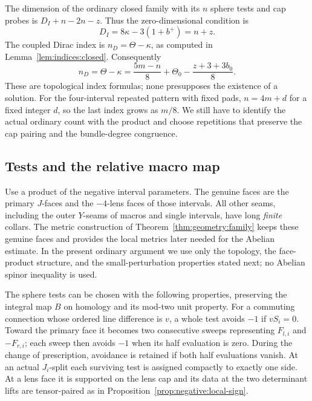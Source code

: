The dimension of the ordinary closed family with its \(n\) sphere
tests and cap probes is \(D_I+n-2n-z\).  Thus the zero-dimensional
condition is
\begin{equation}
 D_I=8\kappa-3(1+b^+)=n+z.
\label{eq:stack:ordinary-dimension}
\end{equation}
The coupled Dirac index is \(n_D=\Theta-\kappa\), as computed in
Lemma~\ref{lem:indices:closed}.  Consequently
\begin{equation}
 n_D=\Theta-\kappa
 =\frac{5m-n}{8}+\Theta_0-\frac{z+3+3b_0}{8}.
\label{eq:stack:dirac-growth}
\end{equation}
These are topological index formulas; none presupposes the existence
of a solution.  For the four-interval repeated pattern with fixed pads,
\(n=4m+d\) for a fixed integer \(d\), so the last index grows as
\(m/8\).  We still have to identify the actual ordinary count with
the product and choose repetitions that preserve the cap pairing and
the bundle-degree congruence.

\subsection{Tests and the relative macro map}

Use a product of the negative interval parameters.  The genuine faces
are the primary \(J\)-faces and the \(-4\)-lens faces of those
intervals.  All other seams, including the outer \(Y\)-seams of
macros and single intervals, have long \emph{finite} collars.
The metric construction of Theorem~\ref{thm:geometry:family} keeps
these genuine faces and provides the local metrics later needed for
the Abelian estimate.  In the present ordinary argument we use only
the topology, the face-product structure, and the small-perturbation
properties stated next; no Abelian spinor inequality is used.

\begin{lemma}
\label{lem:stack:tests}
The sphere tests can be chosen with the following properties, preserving
the integral map \(B\) on homology and its mod-two unit property.
For a commuting connection whose ordered line difference is \(v\),
a whole test avoids \(-1\) if \(vS_i=0\).  Toward the primary
face it becomes two consecutive sweeps representing
\(F_{l,i}\) and \(-F_{r,i}\); each sweep then avoids \(-1\)
when its half evaluation is zero.  During the change of prescription,
avoidance is retained if both half evaluations vanish.  At an actual
\(J_i\)-split each surviving test is assigned compactly to exactly
one side.  At a lens face it is supported on the lens cap and its data
at the two determinant lifts are tensor-paired as in
Proposition~\ref{prop:negative:local-sign}.
\end{lemma}

